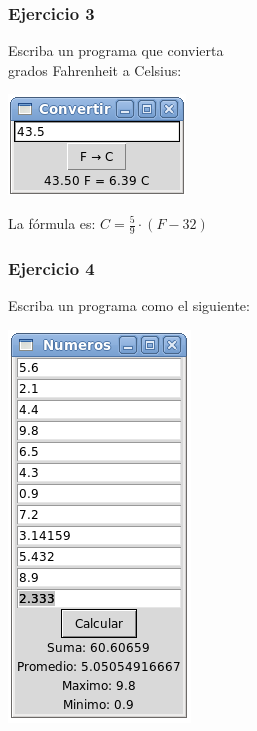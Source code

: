 \documentclass[12pt]{beamer}
\begin{document}
  \begin{frame}
    \label{ejercicio-temperatura}
    \frametitle{Ejercicio 3}
    Escriba un programa que convierta  \\
    grados Fahrenheit a Celsius:
    \vfill

    \includegraphics[width=.5\textwidth]{programas/tkinter/capturas/08.png}
    \vfill

    La fórmula es:
    \(
      \displaystyle
      C = \frac{5}{9}\cdot(F - 32)
    \)
  \end{frame}

  \begin{frame}
    \frametitle{Ejercicio 4}
    \label{ejercicio-estadisticos}
    Escriba un programa como el siguiente:
    \vfill

    \includegraphics[width=.3\textwidth]{programas/tkinter/capturas/09.png}

  \end{frame}
\end{document}
